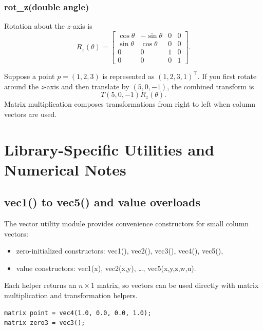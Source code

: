 \documentclass[11pt,a4paper,openany]{book}
\def\code#1{#1}%
\DeclareRobustCommand{\code}[1]{\texttt{\detokenize{#1}}}
\begin{document}
\subsection{\code{rot_z(double angle)}}
Rotation about the \(z\)-axis is
\[
R_z(\theta) =
\begin{bmatrix}
\cos\theta & -\sin\theta & 0 & 0 \\
\sin\theta & \cos\theta & 0 & 0 \\
0 & 0 & 1 & 0 \\
0 & 0 & 0 & 1
\end{bmatrix}.
\]

\begin{examplebox}
Suppose a point \(p=(1,2,3)\) is represented as \((1,2,3,1)^\top\). If you first rotate around the \(z\)-axis and then translate by \((5,0,-1)\), the combined transform is
\[
T(5,0,-1)R_z(\theta).
\]
Matrix multiplication composes transformations from right to left when column vectors are used.
\end{examplebox}

\chapter{Library-Specific Utilities and Numerical Notes}

\section{\code{vec1()} to \code{vec5()} and value overloads}
The vector utility module provides convenience constructors for small column vectors:
\begin{itemize}
    \item zero-initialized constructors: \code{vec1()}, \code{vec2()}, \code{vec3()}, \code{vec4()}, \code{vec5()},
    \item value constructors: \code{vec1(x)}, \code{vec2(x,y)}, \ldots, \code{vec5(x,y,z,w,u)}.
\end{itemize}
Each helper returns an \(n \times 1\) matrix, so vectors can be used directly with matrix multiplication and transformation helpers.

\begin{examplebox}[Example]
\begin{lstlisting}[style=eldaCpp]
matrix point = vec4(1.0, 0.0, 0.0, 1.0);
matrix zero3 = vec3();
\end{lstlisting}
\end{examplebox}
\end{document}
